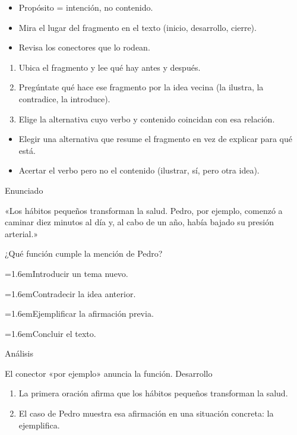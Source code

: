 \documentclass[10pt,a4paper,twocolumn]{article}
\newcommand{\alternativa}[2]{\par\noindent\hangindent=1.6em\hangafter=1\makebox[1.6em][l]{\tecla{#1}}#2\par}
\newcommand{\clave}[1]{\par\smallskip{\sffamily\footnotesize\color{esmeralda} Clave \teclaok{#1}}\par}
\begin{document}
\begin{ideasclave}
\begin{itemize}
  \item Propósito = intención, no contenido.
  \item Mira el lugar del fragmento en el texto (inicio, desarrollo, cierre).
  \item Revisa los conectores que lo rodean.
\end{itemize}
\end{ideasclave}

\begin{metodo}
\begin{enumerate}
  \item Ubica el fragmento y lee qué hay antes y después.
  \item Pregúntate qué hace ese fragmento por la idea vecina (la ilustra, la contradice, la introduce).
  \item Elige la alternativa cuyo verbo y contenido coincidan con esa relación.
\end{enumerate}
\end{metodo}

\begin{errorfrecuente}
\begin{itemize}
  \item Elegir una alternativa que resume el fragmento en vez de explicar para qué está.
  \item Acertar el verbo pero no el contenido (ilustrar, sí, pero otra idea).
\end{itemize}
\end{errorfrecuente}

\begin{ejemplo}
{\sffamily\footnotesize\color{zinc500} Enunciado}\par
«Los hábitos pequeños transforman la salud. Pedro, por ejemplo, comenzó a caminar diez minutos al día y, al cabo de un año, había bajado su presión arterial.»

¿Qué función cumple la mención de Pedro?
\alternativa{A}{Introducir un tema nuevo.}
\alternativa{B}{Contradecir la idea anterior.}
\alternativa{C}{Ejemplificar la afirmación previa.}
\alternativa{D}{Concluir el texto.}
\clave{C}
{\sffamily\footnotesize\color{zinc500} Análisis}\par El conector «por ejemplo» anuncia la función.
{\sffamily\footnotesize\color{zinc500} Desarrollo}
\begin{enumerate}
  \item La primera oración afirma que los hábitos pequeños transforman la salud.
  \item El caso de Pedro muestra esa afirmación en una situación concreta: la ejemplifica.
\end{enumerate}
\end{ejemplo}
\end{document}
